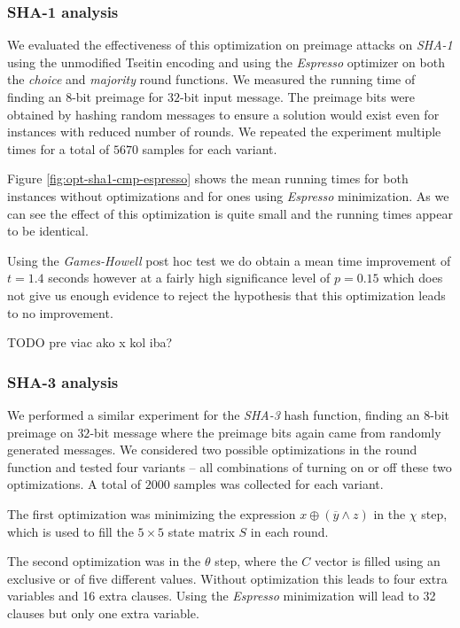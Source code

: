 \subsubsection{SHA-1 analysis}
We evaluated the effectiveness of this optimization on preimage attacks on \emph{SHA-1} using the unmodified Tseitin encoding and using the \emph{Espresso} optimizer on both the \emph{choice} and \emph{majority} round functions.
We measured the running time of finding an $8$-bit preimage for $32$-bit input message.
The preimage bits were obtained by hashing random messages to ensure a solution would exist even for instances with reduced number of rounds.
We repeated the experiment multiple times for a total of $5670$ samples for each variant.
 
Figure \ref{fig:opt-sha1-cmp-espresso} shows the mean running times for both instances without optimizations and for ones using \emph{Espresso} minimization.
As we can see the effect of this optimization is quite small and the running times appear to be identical.


Using the \emph{Games-Howell} post hoc test we do obtain a mean time improvement of $t=1.4$ seconds however at a fairly high significance level of $p=0.15$ which does not give us enough evidence to reject the hypothesis that this optimization leads to no improvement.

TODO pre viac ako x kol iba?

\subsubsection{SHA-3 analysis} 
We performed a similar experiment for the \emph{SHA-3} hash function, finding an $8$-bit preimage on $32$-bit message where the preimage bits again came from randomly generated messages.
We considered two possible optimizations in the round function and tested four variants -- all combinations of turning on or off these two optimizations.
A total of $2000$ samples was collected for each variant.

The first optimization was minimizing the expression $x \oplus (\overline{y} \land z)$ in the $\chi$ step, which is used to fill the $5\times 5$ state matrix $S$ in each round.

The second optimization was in the $\theta$ step, where the $C$ vector is filled using an exclusive or of five different values.
Without optimization this leads to four extra variables and 16 extra clauses.
Using the \emph{Espresso} minimization will lead to 32 clauses but only one extra variable.

